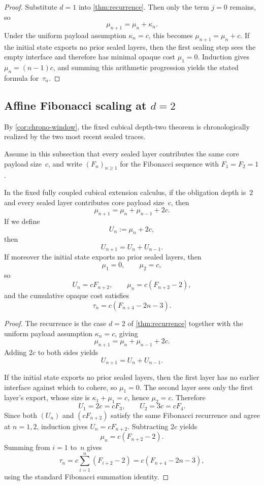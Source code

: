 \documentclass{lmcs}
\begin{document}
\begin{proof}
Substitute $d=1$ into \autoref{thm:recurrence}. Then only the term $j=0$ remains, so
\[
  \mu_{n+1} = \mu_n + \kappa_n.
\]
Under the uniform payload assumption $\kappa_n=c$, this becomes $\mu_{n+1}=\mu_n+c$. If the initial state exports no prior sealed layers, then the first sealing step sees the empty interface and therefore has minimal opaque cost $\mu_1=0$. Induction gives $\mu_n=(n-1)c$, and summing this arithmetic progression yields the stated formula for~$\tau_n$.
\end{proof}

\subsection{\texorpdfstring{Affine Fibonacci scaling at $d=2$}{Affine Fibonacci scaling at d=2}}

By \autoref{cor:chrono-window}, the fixed cubical depth-two theorem is chronologically realized by the two most recent sealed traces.

Assume in this subsection that every sealed layer contributes the same core payload size~$c$, and write $(F_n)_{n \geq 1}$ for the Fibonacci sequence with $F_1=F_2=1$.

\begin{cor}
\label{cor:fibonacci}
In the fixed fully coupled cubical extension calculus, if the obligation depth is~$2$ and every sealed layer contributes core payload size~$c$, then
\[
  \mu_{n+1} = \mu_n + \mu_{n-1} + 2c.
\]
If we define
\[
  U_n := \mu_n + 2c,
\]
then
\[
  U_{n+1} = U_n + U_{n-1}.
\]
If moreover the initial state exports no prior sealed layers, then
\[
  \mu_1 = 0,
  \qquad
  \mu_2 = c,
\]
so
\[
  U_n = cF_{n+2},
  \qquad
  \mu_n = c(F_{n+2}-2),
\]
and the cumulative opaque cost satisfies
\[
  \tau_n = c(F_{n+4}-2n-3).
\]
\end{cor}

\begin{proof}
The recurrence is the case $d=2$ of \autoref{thm:recurrence} together with the uniform payload assumption $\kappa_n=c$, giving
\[
  \mu_{n+1} = \mu_n + \mu_{n-1} + 2c.
\]
Adding $2c$ to both sides yields
\[
  U_{n+1} = U_n + U_{n-1}.
\]

If the initial state exports no prior sealed layers, then the first layer has no earlier interface against which to cohere, so $\mu_1=0$. The second layer sees only the first layer's export, whose size is $\kappa_1+\mu_1=c$, hence $\mu_2=c$. Therefore
\[
  U_1 = 2c = cF_3,
  \qquad
  U_2 = 3c = cF_4.
\]
Since both $(U_n)$ and $(cF_{n+2})$ satisfy the same Fibonacci recurrence and agree at $n=1,2$, induction gives $U_n=cF_{n+2}$. Subtracting $2c$ yields
\[
  \mu_n = c(F_{n+2}-2).
\]
Summing from $i=1$ to~$n$ gives
\[
  \tau_n
  =
  c\sum_{i=1}^n (F_{i+2}-2)
  =
  c(F_{n+4}-2n-3),
\]
using the standard Fibonacci summation identity.
\end{proof}
\end{document}
